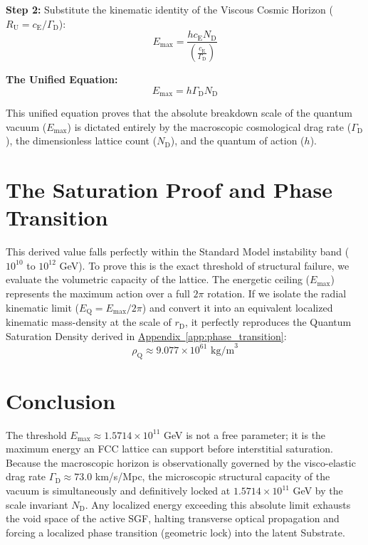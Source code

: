 \vspace{0.5em}
\noindent\textbf{Step 2:} Substitute the kinematic identity of the Viscous Cosmic Horizon ($R_{\mathrm{U}} = c_{\mathrm{E}} / \Gamma_{\mathrm{D}}$):
\begin{equation}
    E_{\mathrm{max}} = \frac{h c_{\mathrm{E}} N_{\mathrm{D}}}{\left( \frac{c_{\mathrm{E}}}{\Gamma_{\mathrm{D}}} \right)}
\end{equation}

\vspace{0.5em}
\noindent\textbf{The Unified Equation:}
\begin{equation}
    E_{\mathrm{max}} = h \Gamma_{\mathrm{D}} N_{\mathrm{D}}
\end{equation}

This unified equation proves that the absolute breakdown scale of the quantum vacuum ($E_{\mathrm{max}}$) is dictated entirely by the macroscopic cosmological drag rate ($\Gamma_{\mathrm{D}}$), the dimensionless lattice count ($N_{\mathrm{D}}$), and the quantum of action ($h$).

\section{The Saturation Proof and Phase Transition}
This derived value falls perfectly within the Standard Model instability band ($10^{10}$ to $10^{12}$ GeV). To prove this is the exact threshold of structural failure, we evaluate the volumetric capacity of the lattice. The energetic ceiling ($E_{\mathrm{max}}$) represents the maximum action over a full $2\pi$ rotation. If we isolate the radial kinematic limit ($E_{\mathrm{Q}} = E_{\mathrm{max}}/2\pi$) and convert it into an equivalent localized kinematic mass-density at the scale of $r_{\mathrm{D}}$, it perfectly reproduces the Quantum Saturation Density derived in \hyperref[app:phase_transition]{Appendix~\ref*{app:phase_transition}}:
\begin{equation}
    \rho_{\mathrm{Q}} \approx 9.077 \times 10^{61} \text{ kg/m}^3
\end{equation}

\section{Conclusion}
The threshold $E_{\mathrm{max}} \approx 1.5714 \times 10^{11}$ GeV is not a free parameter; it is the maximum energy an FCC lattice can support before interstitial saturation. Because the macroscopic horizon is observationally governed by the visco-elastic drag rate $\Gamma_{\mathrm{D}} \approx 73.0$ km/s/Mpc, the microscopic structural capacity of the vacuum is simultaneously and definitively locked at $1.5714 \times 10^{11}$ GeV by the scale invariant $N_{\mathrm{D}}$. Any localized energy exceeding this absolute limit exhausts the void space of the active SGF, halting transverse optical propagation and forcing a localized phase transition (geometric lock) into the latent Substrate.
